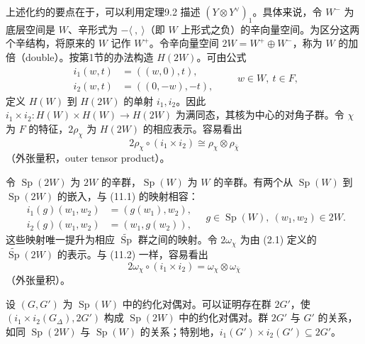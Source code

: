 上述化约的要点在于，可以利用定理9.2 描述 $(Y\otimes Y^\vee)_1$。具体来说，令 $W^-$ 为底层空间是 $W$、辛形式为 $-\langle\ ,\ \rangle$（即 $W$ 上形式之负）的辛向量空间。为区分这两个辛结构，将原来的 $W$ 记作 $W^+$。令辛向量空间 $2W=W^+\oplus W^-$，称为 $W$ 的加倍（double）。按第1节的办法构造 $H(2W)$。可由公式
\[
\begin{aligned}
i_1(w,t)&=((w,0),t),\\
i_2(w,t)&=((0,-w),-t),
\end{aligned}\qquad w\in W,\ t\in F,\tag{11.1}
\]
定义 $H(W)$ 到 $H(2W)$ 的单射 $i_1,i_2$。因此 $i_1\times i_2:H(W)\times H(W)\to H(2W)$ 为满同态，其核为中心的对角子群。令 $\chi$ 为 $F$ 的特征，$2\rho_\chi$ 为 $H(2W)$ 的相应表示。容易看出
\[
2\rho_\chi\circ(i_1\times i_2)\cong\rho_\chi\otimes\rho_{\bar\chi}\tag{11.2}
\]
（外张量积，outer tensor product）。

令 $\operatorname{Sp}(2W)$ 为 $2W$ 的辛群，$\operatorname{Sp}(W)$ 为 $W$ 的辛群。有两个从 $\operatorname{Sp}(W)$ 到 $\operatorname{Sp}(2W)$ 的嵌入，与 (11.1) 的映射相容：
\[
\begin{aligned}
i_1(g)(w_1,w_2)&=(g(w_1),w_2),\\
i_2(g)(w_1,w_2)&=(w_1,g(w_2)),
\end{aligned}\quad g\in\operatorname{Sp}(W),\ (w_1,w_2)\in2W.\tag{11.3}
\]
这些映射唯一提升为相应 $\widetilde{\operatorname{Sp}}$ 群之间的映射。令 $2\omega_\chi$ 为由 (2.1) 定义的 $\widetilde{\operatorname{Sp}}(2W)$ 的表示。与 (11.2) 一样，容易看出
\[
2\omega_\chi\circ(i_1\times i_2)=\omega_\chi\otimes\omega_{\bar\chi}\tag{11.4}
\]
（外张量积）。

设 $(G,G')$ 为 $\operatorname{Sp}(W)$ 中的约化对偶对。可以证明存在群 $2G'$，使 $(i_1\times i_2(G_\Delta),2G')$ 构成 $\operatorname{Sp}(2W)$ 中的约化对偶对。群 $2G'$ 与 $G'$ 的关系，如同 $\operatorname{Sp}(2W)$ 与 $\operatorname{Sp}(W)$ 的关系；特别地，$i_1(G')\times i_2(G')\subseteq2G'$。

